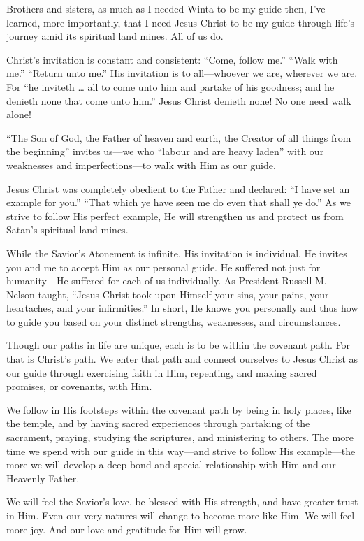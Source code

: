 \documentclass[letterpaper, 11pt]{report}
\begin{document}
Brothers and sisters, as much as I needed Winta to be my guide then, I’ve learned, more importantly, that I need Jesus Christ to be my guide through life’s journey amid its spiritual land mines. All of us do.

Christ’s invitation is constant and consistent: “Come, follow me.” “Walk with me.” “Return unto me.” His invitation is to all—whoever we are, wherever we are. For “he inviteth … all to come unto him and partake of his goodness; and he denieth none that come unto him.” Jesus Christ denieth none! No one need walk alone!

“The Son of God, the Father of heaven and earth, the Creator of all things from the beginning” invites us—we who “labour and are heavy laden” with our weaknesses and imperfections—to walk with Him as our guide.

Jesus Christ was completely obedient to the Father and declared: “I have set an example for you.” “That which ye have seen me do even that shall ye do.” As we strive to follow His perfect example, He will strengthen us and protect us from Satan’s spiritual land mines.

While the Savior’s Atonement is infinite, His invitation is individual. He invites you and me to accept Him as our personal guide. He suffered not just for humanity—He suffered for each of us individually. As President Russell M. Nelson taught, “Jesus Christ took upon Himself your sins, your pains, your heartaches, and your infirmities.” In short, He knows you personally and thus how to guide you based on your distinct strengths, weaknesses, and circumstances.

Though our paths in life are unique, each is to be within the covenant path. For that is Christ’s path. We enter that path and connect ourselves to Jesus Christ as our guide through exercising faith in Him, repenting, and making sacred promises, or covenants, with Him.

We follow in His footsteps within the covenant path by being in holy places, like the temple, and by having sacred experiences through partaking of the sacrament, praying, studying the scriptures, and ministering to others. The more time we spend with our guide in this way—and strive to follow His example—the more we will develop a deep bond and special relationship with Him and our Heavenly Father.

We will feel the Savior’s love, be blessed with His strength, and have greater trust in Him. Even our very natures will change to become more like Him. We will feel more joy. And our love and gratitude for Him will grow.
\end{document}
